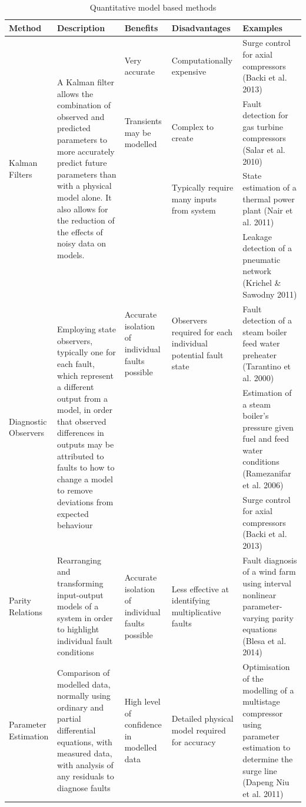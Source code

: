 \begin{table}
\caption{Quantitative model based methods}
\begin{tabular}{p{}p{}p{}p{}p{}}
\toprule
Method &	Description&	Benefits&	Disadvantages&	Examples \\
\toprule
\multirow{4}{.18\textwidth}{Kalman Filters} &\multirow{4}{.18\textwidth}{A Kalman filter allows the combination of observed and predicted parameters to more accurately predict future parameters than with a physical model alone. It also allows for the reduction of the effects of noisy data on models.} & Very accurate&	Computationally expensive&	Surge control for axial compressors (Backi et al. 2013)\\
&  &  Transients may be modelled&	Complex to create&	Fault detection for gas turbine compressors (Salar et al. 2010) \\
& & & Typically require many inputs from system	&State estimation of a thermal power plant (Nair et al. 2011)\\
& & & & Leakage detection of a pneumatic network (Krichel \& Sawodny 2011) \\
\midrule
\multirow{3}{.18\textwidth}{Diagnostic Observers} & \multirow{3}{.18\textwidth}{Employing state observers, typically one for each fault, which represent a different output from a model, in order that observed differences in outputs may be attributed to faults to how to change a model to remove deviations from expected behaviour} & Accurate isolation of individual faults possible &	Observers required for each individual potential fault state &	Fault detection of a steam boiler feed water preheater (Tarantino et al. 2000) \\
 & & & & Estimation of a steam boiler’s pressure given fuel and feed water conditions (Ramezanifar et al. 2006) \\
 & & & & Surge control for axial compressors (Backi et al. 2013)\\
 \midrule
Parity Relations &	Rearranging and transforming input-output models of a system in order to highlight individual fault conditions &	Accurate isolation of individual faults possible &	Less effective at identifying multiplicative faults &	Fault diagnosis of a wind farm using interval nonlinear parameter-varying parity equations (Blesa et al. 2014) \\
\midrule
Parameter Estimation & Comparison of modelled data, normally using ordinary and partial differential equations, with measured data, with analysis of any residuals to diagnose faults
 & High level of confidence in modelled data & Detailed physical model required for accuracy & Optimisation of the modelling of a multistage compressor using parameter estimation to determine the surge line (Dapeng Niu et al. 2011)
 \\
\bottomrule
\end{tabular}
\label{tab:qualitmodel}
\end{table}

